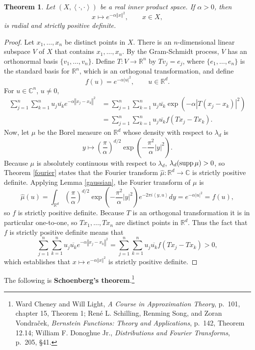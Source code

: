\documentclass{article}
\newcommand{\inner}[2]{\left\langle #1, #2 \right\rangle}
\newcommand{\supp}{\ensuremath\mathrm{supp}\,}
\newcommand{\norm}[1]{\left\Vert #1 \right\Vert}
\newtheorem{theorem}{Theorem}
\theoremstyle{definition}
\begin{document}
\begin{theorem}
Let $(X,\inner{\cdot}{\cdot})$ be a real inner product space. If $\alpha>0$, then
\[
x \mapsto  e^{-\alpha  \norm{x}^2},\qquad x \in X,
\]
is radial and strictly positive definite.
\label{ealpha}
\end{theorem}
\begin{proof}
Let $x_1,\ldots,x_n$ be distinct points in $X$. There is an $n$-dimensional linear subspace
$V$ of $X$ that contains $x_1,\ldots,x_n$. By the Gram-Schmidt process, $V$ has an orthonormal basis
$\{v_1,\ldots,v_n\}$. Define $T:V \to \mathbb{R}^n$ by $Tv_j=e_j$, where $\{e_1,\ldots,e_n\}$ is the standard
basis for $\mathbb{R}^n$, which is an orthogonal transformation, and define
\[
f(u) = e^{-\alpha |u|^2}, \qquad  u \in \mathbb{R}^d.
\]
For $u \in \mathbb{C}^n$, $u \neq 0$,
\begin{align*}
\sum_{j=1}^n \sum_{k=1}^n u_j \overline{u_k} e^{-\alpha \norm{x_j-x_k}^2}
&=\sum_{j=1}^n \sum_{k=1}^n u_j \overline{u_k} \exp\left(-\alpha |T(x_j-x_k)|^2 \right)\\
&=\sum_{j=1}^n \sum_{k=1}^n u_j \overline{u_k} f(Tx_j-Tx_k).
\end{align*}
Now, let $\mu$ be the Borel measure on $\mathbb{R}^d$ whose density with respect to $\lambda_d$ is
\[
y \mapsto \left( \frac{\pi}{\alpha} \right)^{d/2} \exp\left(-\frac{\pi^2}{\alpha} |y|^2 \right).
\]
Because $\mu$ is absolutely continuous with respect to $\lambda_d$, 
$\lambda_d(\supp \mu)>0$, so Theorem \ref{fourier} states that the Fourier transform
$\hat{\mu}:\mathbb{R}^d \to \mathbb{C}$ is strictly positive definite. 
Applying Lemma \ref{gaussian},
the Fourier transform of $\mu$ is
\[
\hat{\mu}(u) = \int_{\mathbb{R}^d} \left( \frac{\pi}{\alpha} \right)^{d/2} \exp\left(-\frac{\pi^2}{\alpha} |y|^2 \right) 
e^{-2\pi  i\inner{y}{u}} dy
=e^{-\alpha |u|^2}=f(u),
\]
so $f$ is strictly positive definite. Because $T$ is an orthogonal transformation it is in particular one-to-one, so
$Tx_1,\ldots,Tx_n$ are distinct points in $\mathbb{R}^d$. Thus the fact that $f$ is strictly positive definite means that
\[
\sum_{j=1}^n \sum_{k=1}^n u_j \overline{u_k} e^{-\alpha \norm{x_j-x_k}^2} = \sum_{j=1}^n \sum_{k=1}^n u_j \overline{u_k} f(Tx_j-Tx_k)
>0,
\]
which establishes that $x \mapsto e^{-\alpha \norm{x}^2}$ is strictly positive definite. 
\end{proof}


The following is \textbf{Schoenberg's theorem}.\footnote{Ward Cheney and Will Light, {\em A Course
in Approximation Theory}, p.~101, chapter 15, Theorem 1;
Ren\'e L. Schilling, Renming Song, and Zoran Vondra\v{c}ek, {\em Bernstein Functions: Theory and Applications}, p.~142, Theorem 12.14;
William F. Donoghue Jr., {\em Distributions and Fourier Transforms}, p.~205, \S 41.}
\end{document}
